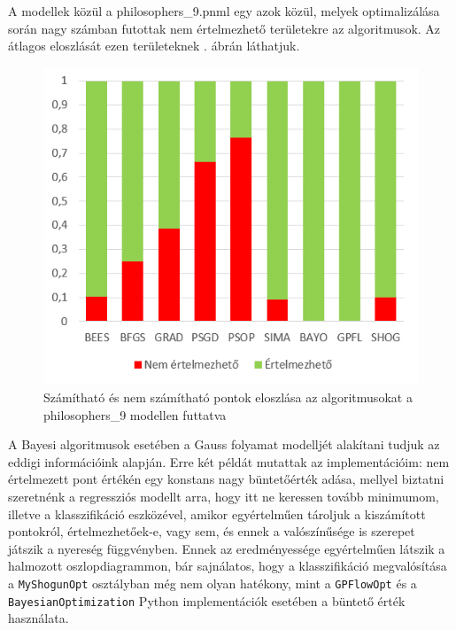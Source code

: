 A modellek közül a philosophers\_9.pnml egy azok közül, melyek optimalizálása során nagy számban futottak nem értelmezhető területekre az algoritmusok. Az átlagos eloszlását ezen területeknek . ábrán láthatjuk.

\begin{figure}[!ht]
	\centering
	\includegraphics{figures/fil9pontaranyok.png}
	\caption{Számítható és nem számítható pontok eloszlása az algoritmusokat a philosophers\_9 modellen futtatva}
	\label{fig:ertelmezhetopontok}
\end{figure}

A Bayesi algoritmusok esetében a Gauss folyamat modelljét alakítani tudjuk az eddigi információink alapján. Erre két példát mutattak az implementációim: nem értelmezett pont értékén egy konstans nagy büntetőérték adása, mellyel biztatni szeretnénk a regressziós modellt arra, hogy itt ne keressen tovább minimumom, illetve a klasszifikáció eszközével, amikor egyértelműen tároljuk a kiszámított pontokról, értelmezhetőek-e, vagy sem, és ennek a valószínűsége is szerepet játszik a nyereség függvényben. Ennek az eredményessége egyértelműen látszik a halmozott oszlopdiagrammon, bár sajnálatos, hogy a klasszifikáció megvalósítása a \texttt{MyShogunOpt} osztályban még nem olyan hatékony, mint a \texttt{GPFlowOpt} és a \texttt{BayesianOptimization} Python implementációk esetében a büntető érték használata.

